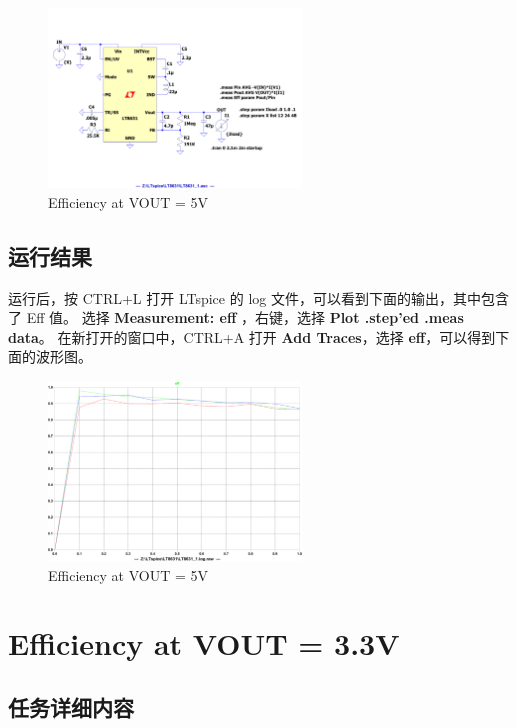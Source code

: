 \documentclass[lang=cn,10pt]{elegantbook}
\begin{document}
\begin{figure}[!htb]
    \centering\includegraphics[page=1, width=0.6\textwidth]{figure/G01_asc.pdf}
    \caption{Efficiency at VOUT = 5V}
\end{figure}

\subsection{运行结果}

运行后，按 CTRL+L 打开 LTspice 的 log 文件，可以看到下面的输出，其中包含了 Eff 值。
选择 \textbf{Measurement: eff} ，右键，选择 \textbf{Plot .step'ed .meas data}。
在新打开的窗口中，CTRL+A 打开 \textbf{Add Traces}，选择 \textbf{eff}，可以得到下面的波形图。

\begin{figure}[!htb]
    \centering\includegraphics[page=1, width=0.6\textwidth]{figure/G01.pdf}
    \caption{Efficiency at VOUT = 5V}
\end{figure}

\section{Efficiency at VOUT = 3.3V}

\subsection{任务详细内容}
\end{document}
